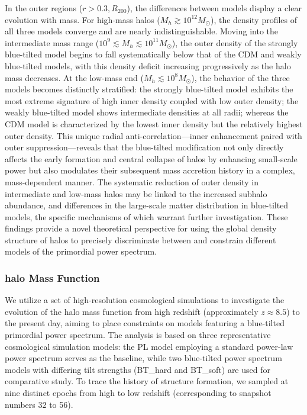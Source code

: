 \documentclass[
 reprint,
 superscriptaddress,
 nofootinbib,
 nobibnotes,
 amsmath,
 amssymb,
 aps,
 prd,
 floatfix,
 longbibliography
]{revtex4-1}
\begin{document}
In the outer regions ($r > 0.3, R_{200}$), the differences between models display a clear evolution with mass. For high-mass halos ($M_h \gtrsim 10^{12} M_\odot$), the density profiles of all three models converge and are nearly indistinguishable. Moving into the intermediate mass range ($10^9 \lesssim M_h \lesssim 10^{11} M_\odot$), the outer density of the strongly blue-tilted model begins to fall systematically below that of the CDM and weakly blue-tilted models, with this density deficit increasing progressively as the halo mass decreases. At the low-mass end ($M_h \lesssim 10^8 M_\odot$), the behavior of the three models becomes distinctly stratified: the strongly blue-tilted model exhibits the most extreme signature of high inner density coupled with low outer density; the weakly blue-tilted model shows intermediate densities at all radii; whereas the CDM model is characterized by the lowest inner density but the relatively highest outer density.
This unique radial anti-correlation---inner enhancement paired with outer suppression---reveals that the blue-tilted modification not only directly affects the early formation and central collapse of halos by enhancing small-scale power but also modulates their subsequent mass accretion history in a complex, mass-dependent manner. The systematic reduction of outer density in intermediate and low-mass halos may be linked to the increased subhalo abundance, and differences in the large-scale matter distribution in blue-tilted models, the specific mechanisms of which warrant further investigation. These findings provide a novel theoretical perspective for using the global density structure of halos to precisely discriminate between and constrain different models of the primordial power spectrum.

\subsubsection{halo Mass Function\label{subsub:HMF}}

We utilize a set of high-resolution cosmological simulations to investigate the evolution of the halo mass function from high redshift (approximately $z \approx 8.5$) to the present day, aiming to place constraints on models featuring a blue-tilted primordial power spectrum. The analysis is based on three representative cosmological simulation models: the PL model employing a standard power-law power spectrum serves as the baseline, while two blue-tilted power spectrum models with differing tilt strengths (BT\_hard and BT\_soft) are used for comparative study. To trace the history of structure formation, we sampled at nine distinct epochs from high to low redshift (corresponding to snapshot numbers 32 to 56).
\end{document}
